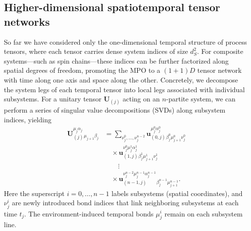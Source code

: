 \documentclass[
    aps,
    prx,
    reprint,
    superscriptaddress,
    longbibliography,
    nofootinbib,
    floatfix,
]{revtex4-2}
\begin{document}
\subsection{Higher-dimensional spatiotemporal tensor networks}
So far we have considered only the one-dimensional temporal structure of process tensors, where each tensor carries dense system indices of size \(d^2_S\). For composite systems---such as spin chains---these indices can be further factorized along spatial degrees of freedom, promoting the MPO to a \((1+1)D\) tensor network with time along one axis and space along the other. Concretely, we decompose the system legs of each temporal tensor into local legs 
associated with individual subsystems. For a unitary tensor \(\mathbf{U}_{(j)}\) acting on an \(n\)-partite system, we can perform a series of singular value decompositions (SVDs) along subsystem indices, yielding
\begin{equation}
\begin{aligned}
    \mathbf{U}_{(j)}^{\mu_j\alpha_j}{}_{\mu_{j+1}\beta_j} 
    &=
    \sum_{\nu_j^0,\dots,\nu_j^{n-2}}
    \mathbf{u}_{(0,j)}^{\mu_j^0\alpha_j^0}
    {}_{\beta_j^0\mu_{j+1}^0\nu_j^0}
    \\
    &\quad \times
    \mathbf{u}_{(1,j)}^{\nu_j^0\mu_j^1\alpha_j^1}
    {}_{\beta_j^1\mu_{j+1}^1\nu_j^1}
    \\
    &\qquad\vdots 
    \\
    &\quad\times
    \mathbf{u}_{(n-1,j)}^{\nu_j^{n-2}\mu_j^{n-1}\alpha_j^{n-1}}
    {}_{\beta_j^{n-1}\mu_{j+1}^{n-1}}.
\end{aligned}
\end{equation}
Here the superscript \(i=0,\dots,n-1\) labels subsystems (spatial coordinates), and \(\nu^i_j\) are newly introduced bond indices that link neighboring subsystems at each time \(t_j\). The environment-induced temporal bonds \(\mu^i_j\) remain on each subsystem line.
\end{document}
